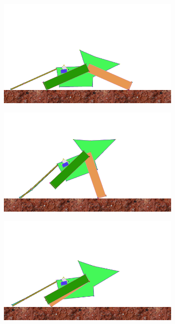\begin{figure}[H]
        \begin{subfigure}[b]{0.3\textwidth}
          \includegraphics[width=\linewidth,center]{graphics/simulation-discussion/ruder_4}
          \caption{\label{fig:ruder_4}}
        \end{subfigure}
        \hspace{\fill}
        \begin{subfigure}[b]{0.3\textwidth}
          \includegraphics[width=\linewidth,center]{graphics/simulation-discussion/ruder_5}
          \caption{\label{fig:ruder_5}}
        \end{subfigure}
        \hspace{\fill}
        \begin{subfigure}[b]{0.3\textwidth}
          \includegraphics[width=\linewidth,center]{graphics/simulation-discussion/ruder_6}
          \caption{\label{fig:ruder_6}}
        \end{subfigure}


\end{figure}
